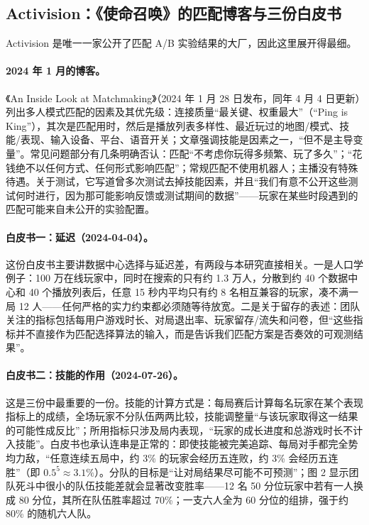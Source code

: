 \subsection{Activision：《使命召唤》的匹配博客与三份白皮书}
\label{sec:ch1b-activision}

Activision 是唯一一家公开了匹配 A/B 实验结果的大厂，因此这里展开得最细。

\paragraph{2024 年 1 月的博客。}
《An Inside Look at Matchmaking》（2024 年 1 月 28 日发布，同年 4 月 4 日更新）列出多人模式匹配的因素及其优先级：连接质量“最关键、权重最大”（“Ping is King”），其次是匹配用时，然后是播放列表多样性、最近玩过的地图/模式、技能/表现、输入设备、平台、语音开关；文章强调技能是因素之一，“但不是主导变量”\cite{activision2024blog}\tagOff。常见问题部分有几条明确否认：匹配“不考虑你玩得多频繁、玩了多久”；“花钱绝不以任何方式、任何形式影响匹配”；常规匹配不使用机器人；主播没有特殊待遇\tagOff。关于测试，它写道曾多次测试去掉技能因素，并且“我们有意不公开这些测试何时进行，因为那可能影响反馈或测试期间的数据”\tagOff——玩家在某些时段遇到的匹配可能来自未公开的实验配置。

\paragraph{白皮书一：延迟（2024-04-04）。}
这份白皮书主要讲数据中心选择与延迟差，有两段与本研究直接相关\cite{activision2024ping}。一是人口学例子：100 万在线玩家中，同时在搜索的只有约 1.3 万人，分散到约 40 个数据中心和 40 个播放列表后，任意 15 秒内平均只有约 8 名相互兼容的玩家，凑不满一局 12 人\tagOff——任何严格的实力约束都必须随等待放宽。二是关于留存的表述：团队关注的指标包括每用户游戏时长、对局退出率、玩家留存/流失和问卷，但“这些指标并不直接作为匹配选择算法的输入，而是告诉我们匹配方案是否奏效的可观测结果”\tagOff。

\paragraph{白皮书二：技能的作用（2024-07-26）。}
这是三份中最重要的一份\cite{activision2024skill}。技能的计算方式是：每局赛后计算每名玩家在某个表现指标上的成绩，全场玩家不分队伍两两比较，技能调整量“与该玩家取得这一结果的可能性成反比”；所用指标只涉及局内表现，“玩家的成长进度和总游戏时长不计入技能”\tagOff。白皮书也承认连串是正常的：即使技能被完美追踪、每局对手都完全势均力敌，“任意连续五局中，约 3\% 的玩家会经历五连败，约 3\% 会经历五连胜”\tagOff（即 $0.5^5\approx3.1\%$）。分队的目标是“让对局结果尽可能不可预测”\tagOff；图 2 显示团队死斗中很小的队伍技能差就会显著改变胜率——12 名 50 分位玩家中若有一人换成 80 分位，其所在队伍胜率超过 70\%；一支六人全为 60 分位的组排，强于约 80\% 的随机六人队\tagOff。

